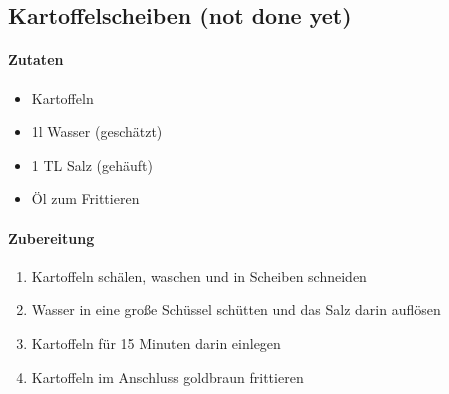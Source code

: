 \newpage
\subsection{Kartoffelscheiben (not done yet)}
\paragraph{Zutaten}
\begin{itemize}[noitemsep]
	\item Kartoffeln
	\item 1l Wasser (geschätzt)
	\item 1 TL Salz (gehäuft)
	\item Öl zum Frittieren
\end{itemize}
\paragraph{Zubereitung}
\begin{enumerate}[noitemsep]
	\item Kartoffeln schälen, waschen und in Scheiben schneiden
	\item Wasser in eine große Schüssel schütten und das Salz darin auflösen
	\item Kartoffeln für 15 Minuten darin einlegen
	\item Kartoffeln im Anschluss goldbraun frittieren
\end{enumerate}